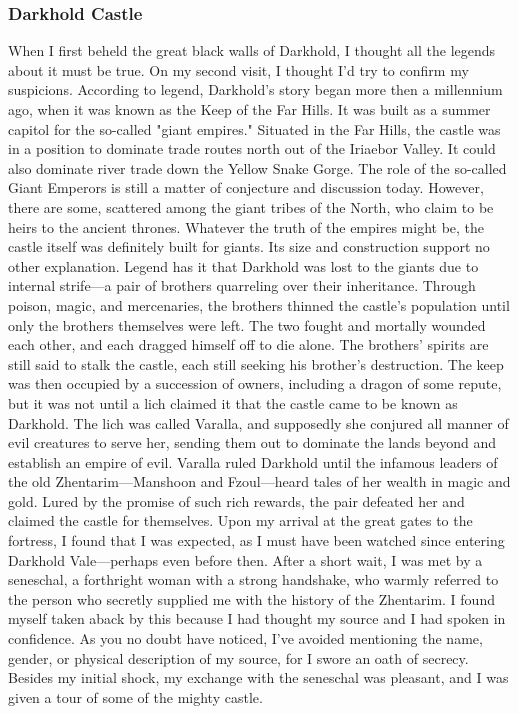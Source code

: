 \documentclass[10pt,a4paper,twoside,twocolumn,openany,bg=print,nodeprecatedcode]{dndbook}
\begin{document}
\subsubsection{Darkhold Castle}
When I first beheld the great black walls of Darkhold, I thought all the legends about it must be true. On my second visit, I thought I'd try to confirm my suspicions.
According to legend, Darkhold's story began more then a millennium ago, when it was known as the Keep of the Far Hills. It was built as a summer capitol for the so-called "giant empires." Situated in the Far Hills, the castle was in a position to dominate trade routes north out of the Iriaebor Valley. It could also dominate river trade down the Yellow Snake Gorge.
The role of the so-called Giant Emperors is still a matter of conjecture and discussion today. However, there are some, scattered among the giant tribes of the North, who claim to be heirs to the ancient thrones. Whatever the truth of the empires might be, the castle itself was definitely built for giants. Its size and construction support no other explanation.
Legend has it that Darkhold was lost to the giants due to internal strife—a pair of brothers quarreling over their inheritance. Through poison, magic, and mercenaries, the brothers thinned the castle's population until only the brothers themselves were left. The two fought and mortally wounded each other, and each dragged himself off to die alone. The brothers' spirits are still said to stalk the castle, each still seeking his brother's destruction.
The keep was then occupied by a succession of owners, including a dragon of some repute, but it was not until a lich claimed it that the castle came to be known as Darkhold. The lich was called Varalla, and supposedly she conjured all manner of evil creatures to serve her, sending them out to dominate the lands beyond and establish an empire of evil. Varalla ruled Darkhold until the infamous leaders of the old Zhentarim—Manshoon and Fzoul—heard tales of her wealth in magic and gold. Lured by the promise of such rich rewards, the pair defeated her and claimed the castle for themselves.
Upon my arrival at the great gates to the fortress, I found that I was expected, as I must have been watched since entering Darkhold Vale—perhaps even before then. After a short wait, I was met by a seneschal, a forthright woman with a strong handshake, who warmly referred to the person who secretly supplied me with the history of the Zhentarim. I found myself taken aback by this because I had thought my source and I had spoken in confidence. As you no doubt have noticed, I've avoided mentioning the name, gender, or physical description of my source, for I swore an oath of secrecy. Besides my initial shock, my exchange with the seneschal was pleasant, and I was given a tour of some of the mighty castle.
\end{document}
